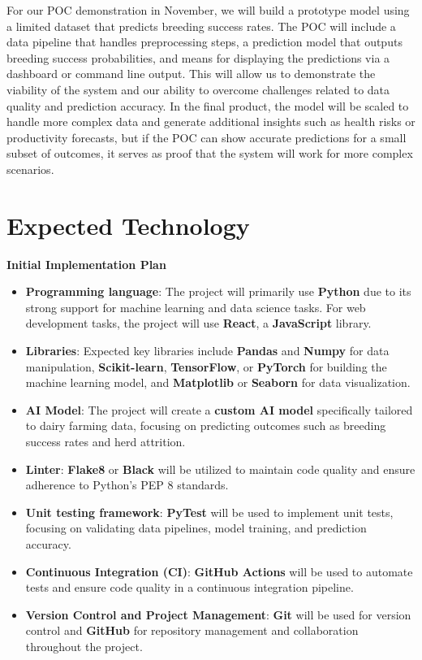 \documentclass{article}
\begin{document}
For our POC demonstration in November, we will build a prototype model using a limited dataset that predicts breeding success rates. The POC will include a data pipeline that handles preprocessing steps, a prediction model that outputs breeding success probabilities, and means for displaying the predictions via a dashboard or command line output. This will allow us to demonstrate the viability of the system and our ability to overcome challenges related to data quality and prediction accuracy. In the final product, the model will be scaled to handle more complex data and generate additional insights such as health risks or productivity forecasts, but if the POC can show accurate predictions for a small subset of outcomes, it serves as proof that the system will work for more complex scenarios.

\section{Expected Technology}
\textbf{Initial Implementation Plan}

\begin{itemize}
    \item \textbf{Programming language}: 
    The project will primarily use \textbf{Python} due to its strong support for machine learning and data science tasks. For web development tasks, the project will use \textbf{React}, a \textbf{JavaScript} library. 
    \item \textbf{Libraries}: 
    Expected key libraries include \textbf{Pandas} and \textbf{Numpy} for data manipulation, \textbf{Scikit-learn}, \textbf{TensorFlow}, or \textbf{PyTorch} for building the machine learning model, and \textbf{Matplotlib} or \textbf{Seaborn} for data visualization.
    \item \textbf{AI Model}: 
    The project will create a \textbf{custom AI model} specifically tailored to dairy farming data, focusing on predicting outcomes such as breeding success rates and herd attrition.
    \item \textbf{Linter}: 
    \textbf{Flake8} or \textbf{Black} will be utilized to maintain code quality and ensure adherence to Python's PEP 8 standards.
    \item \textbf{Unit testing framework}: 
    \textbf{PyTest} will be used to implement unit tests, focusing on validating data pipelines, model training, and prediction accuracy.
    \item \textbf{Continuous Integration (CI)}: 
    \textbf{GitHub Actions} will be used to automate tests and ensure code quality in a continuous integration pipeline.
    \item \textbf{Version Control and Project Management}: 
    \textbf{Git} will be used for version control and \textbf{GitHub} for repository management and collaboration throughout the project.
\end{itemize}
\end{document}

